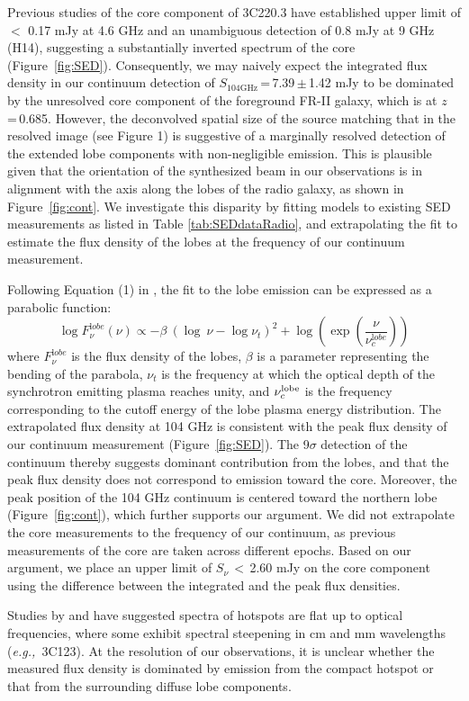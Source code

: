 \documentclass[twocolumn,apj,numberedappendix]{emulateapj}
\newcommand{\eg}{{\sl e.g.,~}}
\begin{document}
Previous studies of the core component of 3C220.3 have established upper 
limit of $<$ 0.17 mJy at 4.6 GHz \citep{Mullin06a} and an unambiguous detection of 0.8 mJy at 9 GHz (H14), suggesting a substantially inverted spectrum of the core (Figure~\ref{fig:SED}).
Consequently, we may naively expect the integrated flux density in our continuum detection of $S_\textrm{104GHz}$\,=\,7.39\,$\pm$\,1.42\,\,mJy to be dominated by the unresolved core component of the foreground FR-II galaxy, which is at $z$\,=\,0.685. 
However, the deconvolved spatial size of the source matching that in the resolved image (see Figure 1) is 
suggestive of a marginally resolved detection of the extended lobe components with non-negligible emission. 
This is plausible given that the orientation of the synthesized beam in our observations is in alignment with the 
axis along the 
lobes of the radio galaxy, as shown in Figure~\ref{fig:cont}. We investigate this disparity by fitting models to 
existing SED measurements as listed in Table \ref{tab:SEDdataRadio}, and extrapolating the fit to 
estimate the flux density of the lobes at the frequency of our continuum measurement. 

Following Equation (1) in \citet{Cleary07a}, the fit to the lobe emission can be expressed as a parabolic function:
\begin{equation}
\log F_{\nu}^{\mathrm lobe} (\nu) \propto - \beta\ (\log\ \nu - \log \nu_{t})^2  + \log (\exp({\frac{\nu}{\nu_c^{\mathrm lobe}}}))
\end{equation}
where $F_{\nu}^{\mathrm lobe}$ is the flux density of the lobes, $\beta$ is a parameter representing the bending 
of the parabola, $\nu_t$ is the frequency at which the optical depth of the synchrotron emitting plasma reaches 
unity, and $\nu_c^{\rm lobe}$ is the frequency corresponding to the cutoff energy of the lobe plasma energy 
distribution. 
The extrapolated flux density at 104\,\,GHz is consistent with the peak flux density of our continuum 
measurement (Figure~\ref{fig:SED}). The 9$\sigma$ detection of the continuum thereby suggests
dominant contribution from the lobes, and that the peak flux density does not correspond to emission toward 
the core. Moreover, the peak position of the 104\,\,GHz continuum is
centered toward the northern lobe (Figure~\ref{fig:cont}), which further supports our argument. We did not 
extrapolate the core measurements to the frequency of our continuum, as previous measurements of the core are 
taken 
across different epochs. 
Based on our argument, we place an upper limit of $S_\nu$\,$<$\,2.60 mJy on the core component using the difference between the integrated and the peak flux densities.
\par
Studies by \citet{Meisenheimer89a} and \citet{Hardcastle08a} have suggested spectra of hotspots are flat up to optical frequencies, where some exhibit spectral steepening in cm and mm wavelengths (\eg 3C123). At the resolution of our observations, it is unclear whether the measured flux density is dominated by emission from the compact hotspot or that from the surrounding diffuse lobe components.
\end{document}
